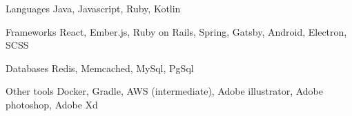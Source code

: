 
\begin{cvskills}
  \cvskill
    {Languages} %
    {Java, Javascript, Ruby, Kotlin} %

  \cvskill
    {Frameworks} %
    {React, Ember.js, Ruby on Rails, Spring, Gatsby, Android, Electron, SCSS} %

  \cvskill
    {Databases} %
    {Redis, Memcached, MySql, PgSql} %

  \cvskill
    {Other tools} %
    {Docker, Gradle, AWS (intermediate), Adobe illustrator, Adobe photoshop, Adobe Xd} %
  
\end{cvskills}